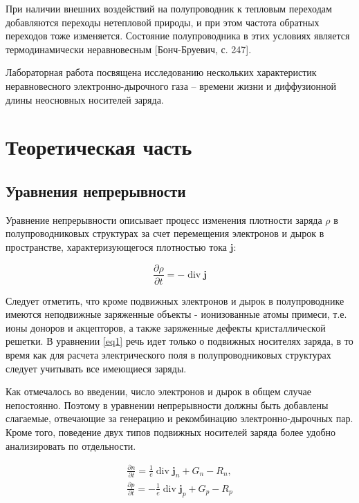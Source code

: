 \documentclass[a4paper,14pt]{extarticle}
\DeclareMathOperator{\Div}{div}
\renewcommand{\vec}{\mathbf} %
\begin{document}
При наличии внешних воздействий на полупроводник к тепловым переходам добавляются переходы нетепловой природы, и при этом частота обратных переходов тоже изменяется. Состояние полупроводника в этих условиях является термодинамически неравновесным [Бонч-Бруевич, с. 247].

Лабораторная работа посвящена исследованию нескольких характеристик неравновесного электронно-дырочного газа -- времени жизни и диффузионной длины неосновных носителей заряда. 

\section{Теоретическая часть}
\subsection{Уравнения непрерывности}

Уравнение непрерывности описывает процесс изменения плотности заряда $\rho$ в полупроводниковых структурах за счет перемещения электронов и дырок в пространстве, характеризующегося плотностью тока $\vec{j}$:

\begin{equation}
	\label{eq1}
	\frac{\partial \rho}{\partial t}=-\operatorname{div} \vec{j}
\end{equation}

Следует отметить, что кроме подвижных электронов и дырок в полупроводнике имеются неподвижные заряженные объекты - ионизованные атомы примеси, т.е. ионы доноров и акцепторов, а также заряженные дефекты кристаллической решетки. В уравнении \eqref{eq1} речь идет только о подвижных носителях заряда, в то время как для расчета электрического поля в полупроводниковых структурах следует учитывать все имеющиеся заряды.

Как отмечалось во введении, число электронов и дырок в общем случае непостоянно. Поэтому в уравнении непрерывности должны быть добавлены слагаемые, отвечающие за генерацию и рекомбинацию электронно-дырочных пар. Кроме того, поведение двух типов подвижных носителей заряда более удобно анализировать по отдельности.

\begin{gather}
	\label{eq2}
	\frac{\partial n}{\partial t}=\frac{1}{e} \Div \vec{j}_{n}+G_{n}-R_{n},\\ \nonumber
	\frac{\partial p}{\partial t}=-\frac{1}{e} \Div \vec{j}_{p}+G_{p}-R_{p}
\end{gather}
\end{document}
